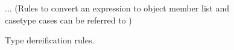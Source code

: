 \begin{figure}[ht]
\begin{center}
\DP
\end{center}

\begin{center}
\DP
\end{center}

\begin{center}
\DP
\end{center}

\begin{center}
\DP
\end{center}

... (Rules to convert an expression to object member list and casetype cases can be referred to  )
\caption{Type dereification rules.}
\label{dereification}
\end{figure}